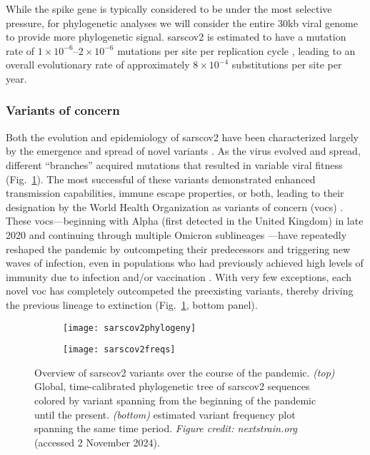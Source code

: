 While the spike gene is typically considered to be under the most selective pressure, for phylogenetic analyses we will consider the entire 30kb viral genome to provide more phylogenetic signal.
\gls{sarscov2} is estimated to have a mutation rate of $1\times10^{-6}$--$2\times10^{-6}$ mutations per site per replication cycle \citep{markov2023evolution}, leading to an overall evolutionary rate of approximately $8\times10^{-4}$ substitutions per site per year.

\subsubsection{Variants of concern}
Both the evolution and epidemiology of \gls{sarscov2} have been characterized largely by the emergence and spread of novel variants \citep{Carabelli2023}.
As the virus evolved and spread, different ``branches'' acquired mutations that resulted in variable viral fitness (Fig.~\ref{fig:sarscov2phylo}).
The most successful of these variants demonstrated enhanced transmission capabilities, immune escape properties, or both, leading to their designation by the World Health Organization as variants of concern (\gls{voc}s) \citep{attwood2022phylogenetic}.
These \gls{voc}s---beginning with Alpha (first detected in the United Kingdom) in late 2020 \citep{volz2021assessing}and continuing through multiple Omicron sublineages \citep{bellusci2023neutralization}---have repeatedly reshaped the pandemic by outcompeting their predecessors and triggering new waves of infection, even in populations who had previously achieved high levels of immunity due to infection and/or vaccination \citep{hu2022increased}.
With very few exceptions, each novel \gls{voc} has completely outcompeted the preexisting variants, thereby driving the previous lineage to extinction (Fig.~\ref{fig:sarscov2phylo}, bottom panel).

\begin{figure}[ht]
  \centering
  \begin{subfigure}{\textwidth}
    \texttt{[image: sarscov2phylogeny]}
  \end{subfigure}
  \begin{subfigure}{\textwidth}
    \texttt{[image: sarscov2freqs]}
  \end{subfigure}
  \caption[SARS-CoV-2 phylogeny and variant frequencies]{Overview of \gls{sarscov2} variants over the course of the pandemic. \textit{(top)} Global, time-calibrated phylogenetic tree of \gls{sarscov2} sequences colored by variant spanning from the beginning of the pandemic until the present. \textit{(bottom)} estimated variant frequency plot spanning the same time period. \textit{Figure credit: nextstrain.org} \citep{hadfield2018nextstrain} (accessed 2 November 2024).}
  \label{fig:sarscov2phylo}
\end{figure}

